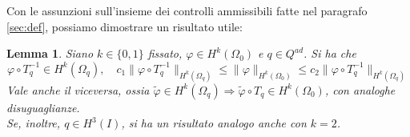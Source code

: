 \documentclass[a4paper,11pt,twoside]{article}
\newcommand{\Q}{Q^{ad}}
\renewcommand{\O}{{\Omega_0}}
\newcommand{\Oq}{{\Omega_q}}
\theoremstyle{plain}
\newtheorem{lemma}[teor]{Lemma}
\theoremstyle{definition}
\theoremstyle{remark}
\begin{document}
Con le assunzioni sull'insieme dei controlli ammissibili fatte nel paragrafo \ref{sec:def}, possiamo dimostrare un risultato utile:
\begin{lemma}
	Siano $k\in\{0,1\}$ fissato, $\varphi\in H^{k}(\O)$ e $q\in\Q$. Si ha che
	$$\varphi\circ T_q^{-1}\in H^k(\Oq),\quad c_1\|\varphi\circ T_q^{-1}\|_{H^k(\Oq)}\leq\|\varphi\|_{H^k(\O)}\leq c_2\|\varphi\circ T_q^{-1}\|_{H^k(\Oq)}$$
	Vale anche il viceversa, ossia $\widetilde{\varphi}\in H^k(\Oq)\Rightarrow\widetilde{\varphi}\circ T_q\in H^k(\O)$, con analoghe disuguaglianze.\\
	Se, inoltre, $q\in H^3(I)$, si ha un risultato analogo anche con $k=2$.
\label{th:HkTq}
\end{lemma}





\appendix
\clearpage
\newpage
%


\end{document}
